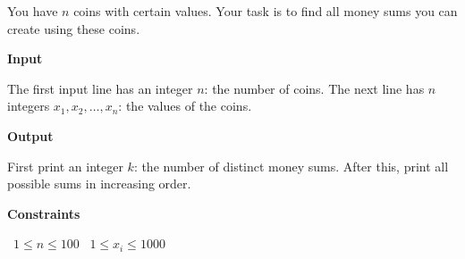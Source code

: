 You have $n$ coins with certain values. Your task is to find all money sums you can create using these coins.

\vspace{0.3cm}\noindent\textbf{Input}

The first input line has an integer $n$: the number of coins.
The next line has $n$ integers $x_1,x_2,\dots,x_n$: the values of the coins.

\vspace{0.3cm}\noindent\textbf{Output}

First print an integer $k$: the number of distinct money sums. After this, print all possible sums in increasing order.

\vspace{0.3cm}\noindent\textbf{Constraints}

\textbullet\ $1 \le n \le 100$
\textbullet\ $1 \le x_i \le 1000$